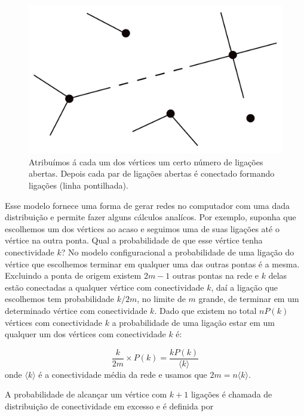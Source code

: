 \documentclass[a4paper,11pt]{report}
\begin{document}
\begin{figure}[ht!]
\begin{center}
\includegraphics[scale=0.15]{./images/config-model.pdf}
\end{center}
\caption{Atribu\'imos \'a cada um dos v\'ertices um certo n\'umero de liga\c{c}\~oes abertas. Depois cada par de liga\c{c}\~oes abertas \'e conectado formando liga\c{c}\~oes (linha pontilhada).}
\label{fig:config-model}
\end{figure}

Esse modelo fornece uma forma de gerar redes no computador com uma dada distribui\c{c}\~ao e permite fazer alguns c\'alculos anal\'icos. Por exemplo, suponha que escolhemos um dos v\'ertices ao acaso e seguimos uma de suas liga\c{c}\~oes at\'e o v\'ertice na outra ponta. Qual a probabilidade de que esse v\'ertice tenha conectividade $k$? No modelo configuracional a probabilidade de uma liga\c{c}\~ao do v\'ertice que escolhemos terminar em qualquer uma das outras pontas \'e a mesma. Excluindo a ponta de origem existem  $2m-1$ outras pontas na rede e $k$ delas est\~ao conectadas a qualquer v\'ertice com conectividade $k$, da\'i a liga\c{c}\~ao que escolhemos tem probabilidade $k/2m$, no limite de $m$ grande, de terminar em um determinado v\'ertice com conectividade $k$. Dado que existem no total $nP(k)$ v\'ertices com conectividade $k$ a probabilidade de uma liga\c{c}\~ao estar em um qualquer um dos v\'ertices com conectividade $k$ \'e:

\begin{equation}
\frac{k}{2m}\times P(k)=\frac{kP(k)}{\langle k\rangle}
\end{equation}
onde $\langle k\rangle$ \'e a conectividade m\'edia da rede e usamos que  $2m=n\langle k\rangle$. 

A probabilidade de alcan\c{c}ar um v\'ertice com $k+1$ liga\c{c}\~oes \'e chamada de distribui\c{c}\~ao de conectividade em excesso e \'e definida por
\end{document}
